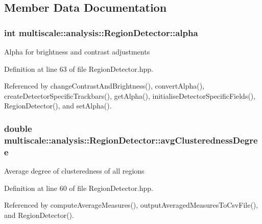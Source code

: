 \subsection{Member Data Documentation}
\hypertarget{classmultiscale_1_1analysis_1_1RegionDetector_ab768a3bbfff9835b441a889ab2cb05a6}{
\subsubsection[{alpha}]{\setlength{\rightskip}{0pt plus 5cm}int multiscale\-::analysis\-::\-Region\-Detector\-::alpha\hspace{0.3cm}{\ttfamily [private]}}}\label{classmultiscale_1_1analysis_1_1RegionDetector_ab768a3bbfff9835b441a889ab2cb05a6}
Alpha for brightness and contrast adjustments 

Definition at line 63 of file Region\-Detector.\-hpp.



Referenced by change\-Contrast\-And\-Brightness(), convert\-Alpha(), create\-Detector\-Specific\-Trackbars(), get\-Alpha(), initialise\-Detector\-Specific\-Fields(), Region\-Detector(), and set\-Alpha().

\hypertarget{classmultiscale_1_1analysis_1_1RegionDetector_ad2614f07ff1dfa25af6f7eaa10fe8ea8}{
\subsubsection[{avg\-Clusteredness\-Degree}]{\setlength{\rightskip}{0pt plus 5cm}double multiscale\-::analysis\-::\-Region\-Detector\-::avg\-Clusteredness\-Degree\hspace{0.3cm}{\ttfamily [private]}}}\label{classmultiscale_1_1analysis_1_1RegionDetector_ad2614f07ff1dfa25af6f7eaa10fe8ea8}
Average degree of clusteredness of all regions 

Definition at line 60 of file Region\-Detector.\-hpp.



Referenced by compute\-Average\-Measures(), output\-Averaged\-Measures\-To\-Csv\-File(), and Region\-Detector().

